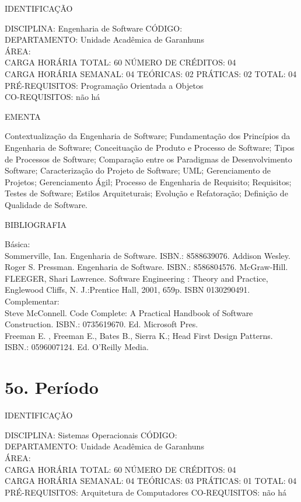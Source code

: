 \documentclass[
	12pt,				%
	openright,			%
  oneside,     %
	a4paper,			%
	english,			%
	french,				%
	spanish,			%
	brazil				%
	]{abntex2}
\begin{document}
\begin{apendicesenv}
\newpage IDENTIFICAÇÃO

DISCIPLINA: Engenharia de Software CÓDIGO:\\ 
DEPARTAMENTO: Unidade Acadêmica de Garanhuns\\
ÁREA: \\
CARGA HORÁRIA TOTAL: 60 NÚMERO DE CRÉDITOS: 04\\
CARGA HORÁRIA SEMANAL: 04 TEÓRICAS: 02 PRÁTICAS: 02 TOTAL: 04\\
PRÉ-REQUISITOS: Programação Orientada a Objetos\\
CO-REQUISITOS: não há

EMENTA 

Contextualização da Engenharia de Software; Fundamentação dos Princípios
da Engenharia de Software; Conceituação de Produto e Processo de
Software; Tipos de Processos de Software; Comparação entre os
Paradigmas de Desenvolvimento Software; Caracterização do Projeto de
Software; UML; Gerenciamento de Projetos; Gerenciamento Ágil; Processo
de Engenharia de Requisito; Requisitos; Testes de Software; Estilos
Arquiteturais; Evolução e Refatoração; Definição de Qualidade de
Software.

BIBLIOGRAFIA 

Básica:\\
Sommerville, Ian. Engenharia de Software. ISBN.: 8588639076. Addison 
Wesley.\\
Roger S. Pressman. Engenharia de Software. ISBN.: 8586804576.
McGraw-Hill.\\
FLEEGER, Shari Lawrence. Software Engineering : Theory and Practice,
Englewood Cliffs, N. J.:Prentice Hall, 2001, 659p. ISBN 0130290491.\\
Complementar:\\
Steve McConnell. Code Complete: A Practical Handbook of Software
Construction. ISBN.: 0735619670. Ed. Microsoft Pres.\\
Freeman E. , Freeman E., Bates B., Sierra K.; Head First Design
Patterns. ISBN.: 0596007124. Ed. O'Reilly Media.\
\newpage 

\section*{5o. Período}

IDENTIFICAÇÃO

DISCIPLINA: Sistemas Operacionais CÓDIGO:\\ 
DEPARTAMENTO: Unidade Acadêmica de Garanhuns\\
ÁREA: \\
CARGA HORÁRIA TOTAL: 60 NÚMERO DE CRÉDITOS: 04\\
CARGA HORÁRIA SEMANAL: 04 TEÓRICAS: 03 PRÁTICAS: 01 TOTAL: 04\\
PRÉ-REQUISITOS: Arquitetura de Computadores 
CO-REQUISITOS: não há


\end{apendicesenv}
\end{document}
